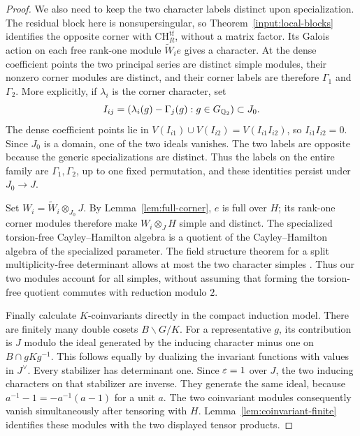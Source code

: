 \begin{proof}
We also need to keep the two character labels distinct upon
specialization. The residual block here is nonsupersingular, so
Theorem~\ref{input:local-blocks} identifies the opposite corner with
\(\mathrm{CH}_R^{\mathrm{tf}}\), without a matrix factor.
Its Galois action on each free rank-one module
\(\widetilde W_i e\) gives a character. At the dense coefficient
points the two principal series are distinct simple modules, their
nonzero corner modules are distinct, and their corner labels are
therefore \(\Gamma_1\) and \(\Gamma_2\). More explicitly, if
\(\lambda_i\) is the corner character, set
\[
 I_{ij}=(\lambda_i(g)-\Gamma_j(g):g\in G_{\mathbb Q_2})\subset J_0.
\]
The dense coefficient points lie in
\(V(I_{i1})\cup V(I_{i2})=V(I_{i1}I_{i2})\), so
\(I_{i1}I_{i2}=0\). Since \(J_0\) is a domain, one of the two ideals
vanishes. The two labels are opposite because the generic
specializations are distinct. Thus the labels on the entire family
are \(\Gamma_1,\Gamma_2\), up to one fixed permutation, and these
identities persist under \(J_0\to J\).

Set \(W_i=\widetilde W_i\otimes_{J_0}J\). By
Lemma~\ref{lem:full-corner}, \(e\) is full over \(H\); its rank-one
corner modules therefore make \(W_i\otimes_JH\) simple and distinct.
The specialized torsion-free Cayley--Hamilton algebra is a quotient
of the Cayley--Hamilton algebra of the specialized parameter. The
field structure theorem for a split multiplicity-free determinant
allows at most the two character simples
\cite[Theorems~2.12 and~2.22]{Chenevier2014}. Thus our two modules
account for all simples, without assuming that forming the torsion-free quotient
commutes with reduction modulo \(2\).

Finally calculate \(K\)-coinvariants directly in the compact
induction model. There are finitely many double cosets
\(B\backslash G/K\). For a representative \(g\), its contribution
is \(J\) modulo the ideal generated by the inducing character minus
one on \(B\cap gKg^{-1}\). This follows equally by dualizing the
invariant functions with values in \(J^\vee\). Every stabilizer has
determinant one. Since \(\varepsilon=1\) over \(J\), the two inducing
characters on that stabilizer are inverse. They generate the same
ideal, because \(a^{-1}-1=-a^{-1}(a-1)\) for a unit \(a\).
The two coinvariant modules consequently vanish simultaneously after
tensoring with \(H\). Lemma~\ref{lem:coinvariant-finite} identifies
these modules with the two displayed tensor products.
\end{proof}


